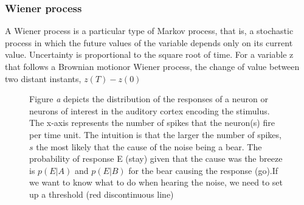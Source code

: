 \documentclass[11pt, onecolumn]{article}
\begin{document}
\subsubsection*{Wiener process}
A Wiener process is a particular type of Markov process, that is, a stochastic process in which the future values of the variable depends only on its current value. Uncertainty is proportional to the square root of time. For a variable z that follows a Brownian motionor Wiener process, the change of value between two distant instants, $z(T) - z(0)$

 
\begin{figure}[H]
    \hfill
    \caption{Figure \emph{a} depicts the distribution of the responses of a neuron or neurons of interest in the auditory cortex encoding the stimulus. The x-axis represents the number of spikes that the neuron(s) fire per time unit. The intuition is that the larger the number of spikes, $s$ the most likely that the cause of the noise being a bear. The probability of response E (stay) given that the cause was the breeze is $p(E|A)$ and  $p(E|B)$ for the bear causing the response (go).If we want to know what to do when hearing the noise, we need to set up a threshold (red discontinuous line) }
    \label{fig:lkhratio}
\end{figure}
\end{document}
